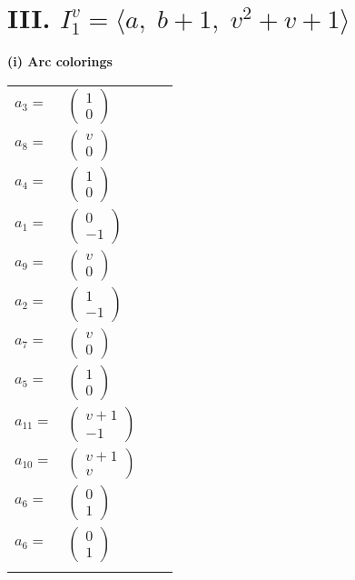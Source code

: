 \documentclass[1p]{elsarticle_modified}
\theoremstyle{definition}
\begin{document}
\centering \section*{III. $I^v_{1}= \langle a,\;b+1,\;v^2+v+1 \rangle$}
\flushleft \textbf{(i) Arc colorings}\\
\begin{tabular}{m{7pt} m{180pt} m{7pt} m{180pt} }
\flushright $a_{3}=$&$\begin{pmatrix}1\\0\end{pmatrix}$ \\
\flushright $a_{8}=$&$\begin{pmatrix}v\\0\end{pmatrix}$ \\
\flushright $a_{4}=$&$\begin{pmatrix}1\\0\end{pmatrix}$ \\
\flushright $a_{1}=$&$\begin{pmatrix}0\\-1\end{pmatrix}$ \\
\flushright $a_{9}=$&$\begin{pmatrix}v\\0\end{pmatrix}$ \\
\flushright $a_{2}=$&$\begin{pmatrix}1\\-1\end{pmatrix}$ \\
\flushright $a_{7}=$&$\begin{pmatrix}v\\0\end{pmatrix}$ \\
\flushright $a_{5}=$&$\begin{pmatrix}1\\0\end{pmatrix}$ \\
\flushright $a_{11}=$&$\begin{pmatrix}v+1\\-1\end{pmatrix}$ \\
\flushright $a_{10}=$&$\begin{pmatrix}v+1\\v\end{pmatrix}$ \\
\flushright $a_{6}=$&$\begin{pmatrix}0\\1\end{pmatrix}$\\ \flushright $a_{6}=$&$\begin{pmatrix}0\\1\end{pmatrix}$\\&\end{tabular}
\end{document}
